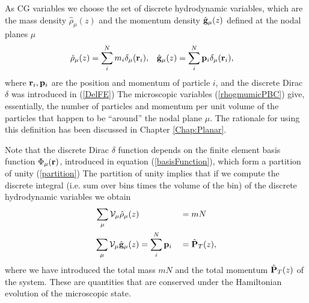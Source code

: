 \documentclass[b5paper,openright,10pt]{book}
\begin{document}
As CG variables we choose  the set of discrete hydrodynamic
variables,  which are  the  mass density  $\hat{\rho}_\mu(z)$ and  the
momentum  density $\hat{\bf  g}_\mu(z)$  defined at  the nodal  planes
$\mu$   
\begin{align}
  \hat{\rho}_\mu(z)&= \sum_i^Nm_i\delta_\mu({\bf r}_i),&
\hat{\bf g}_\mu(z)&= \sum_i^N{\bf p}_i\delta_\mu({\bf r}_i),
\label{rhogmumicPBC}
\end{align}
where ${\bf r}_i,{\bf p}_i$ are the position and momentum of particle $i$, and the discrete Dirac $\delta$ was introduced in (\ref{DelFE})
The  microscopic  variables  (\ref{rhogmumicPBC})  give,
essentially, the number  of particles and momentum per  unit volume of
the particles that happen to be ``around'' the nodal plane $\mu$.  The rationale for using this definition has been discussed in Chapter \ref{Chap:Planar}.


Note that the discrete Dirac $\delta$ function depends on the finite  element basis  function $\Phi_\mu({\bf  r})$, introduced in equation (\ref{basisFunction}), which form a
partition of unity (\ref{partition})
The  partition  of unity  implies  that  if  we compute  the  discrete
integral  (i.e. sum  over bins  times the  volume of  the bin)  of the
discrete hydrodynamic variables we obtain
\begin{align}
  \sum_\mu{\cal V}_\mu\hat{\rho}_\mu(z)&  &&= mN
\nonumber\\
  \sum_\mu{\cal V}_\mu\hat{\bf g}_\mu(z)&=\sum_i^N{\bf p}_i&&= \hat{\bf P}_T(z),
\label{DiscCons}
\end{align}
where we  have introduced the total  mass $mN$ and the  total momentum
$\hat{\bf  P}_T(z)$ of  the  system.  These  are  quantities that  are
conserved under  the Hamiltonian  evolution of the  microscopic state.
\end{document}
